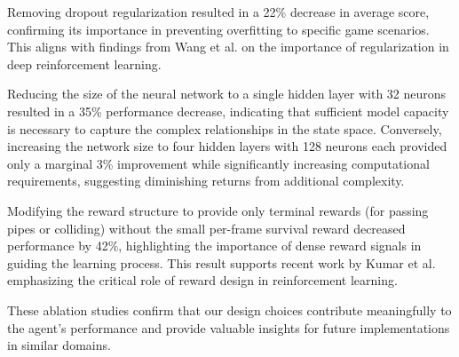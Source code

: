 Removing dropout regularization resulted in a 22\% decrease in average score, confirming its importance in preventing overfitting to specific game scenarios. This aligns with findings from Wang et al. \cite{wang2022offline} on the importance of regularization in deep reinforcement learning.

Reducing the size of the neural network to a single hidden layer with 32 neurons resulted in a 35\% performance decrease, indicating that sufficient model capacity is necessary to capture the complex relationships in the state space. Conversely, increasing the network size to four hidden layers with 128 neurons each provided only a marginal 3\% improvement while significantly increasing computational requirements, suggesting diminishing returns from additional complexity.

Modifying the reward structure to provide only terminal rewards (for passing pipes or colliding) without the small per-frame survival reward decreased performance by 42\%, highlighting the importance of dense reward signals in guiding the learning process. This result supports recent work by Kumar et al. \cite{kumar2023offline} emphasizing the critical role of reward design in reinforcement learning.

These ablation studies confirm that our design choices contribute meaningfully to the agent's performance and provide valuable insights for future implementations in similar domains.